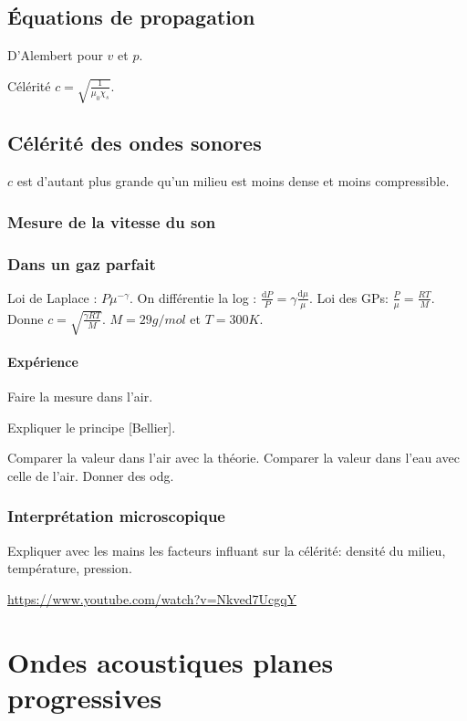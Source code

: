 \documentclass[11pt]{report}
\numberwithin{figure}{section}
\numberwithin{equation}{section}
\numberwithin{table}{section}
\newcommand{\ud}{\mathrm{d}}
\newcommand{\1}{\boldsymbol{1}}
\begin{document}
\subsection{Équations de propagation}

D'Alembert pour $v$ et $p$.

Célérité $c = \sqrt{\frac{1}{\mu_0 \chi_s}}$.

\subsection{Célérité des ondes sonores}

$c$ est d'autant plus grande qu'un milieu est moins dense et moins compressible.

\subsubsection{Mesure de la vitesse du son}

\subsubsection{Dans un gaz parfait}

Loi de Laplace : $P \mu^{-\gamma}$. On différentie la log : $\frac{\ud P}{P} = \gamma \frac{\ud \mu}{\mu}.$ Loi des GPs: $\frac{P}{\mu} = \frac{RT}{M}$. Donne $c = \sqrt{\frac{\gamma R T}{M}}$. $M = 29g/mol$ et $T = 300K$.

\paragraph{Expérience} Faire la mesure dans l'air.

Expliquer le principe [Bellier].

Comparer la valeur dans l'air avec la théorie. Comparer la valeur dans l'eau avec celle de l'air. Donner des odg.

\subsubsection{Interprétation microscopique} 

Expliquer avec les mains les facteurs influant sur la célérité: densité du milieu, température, pression.

\url{https://www.youtube.com/watch?v=Nkved7UcgqY}

\section{Ondes acoustiques planes progressives}
\end{document}
